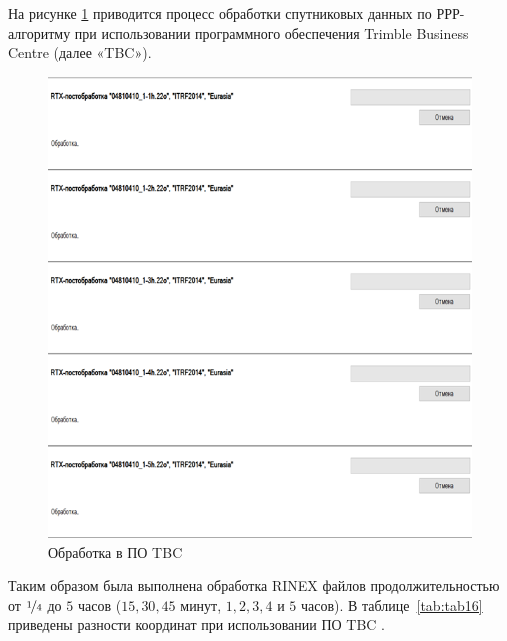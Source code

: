 На рисунке \cref{fig:pic10} приводится процесс обработки спутниковых данных по РРР-алгоритму при использовании программного обеспечения Trimble Business Centre (далее «TBC»).
\begin{figure}[p]
	\centering
	\includegraphics[width=\linewidth]{images/pic10}
	\caption{Обработка в ПО TBC}
	\label{fig:pic10}
\end{figure}

Таким образом была выполнена обработка RINEX файлов продолжительностью  от $\nicefrac{1}{4}$ до $5$ часов ($15, 30, 45$ минут, $1, 2, 3, 4$ и $5$ часов). В таблице~\cref{tab:tab16} приведены разности координат при использовании ПО TBC \cite{mak05,mak08}.


